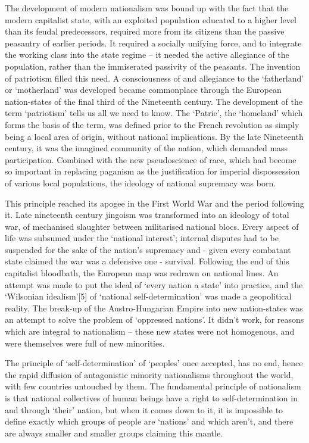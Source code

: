 The development of modern nationalism was bound up with the fact that the modern capitalist state, with an exploited population educated to a higher level than its feudal predecessors, required more from its citizens than the passive peasantry of earlier periods.
It required a socially unifying force, and to integrate the working class into the state regime – it needed the active allegiance of the population, rather than the immiserated passivity of the peasants.
The invention of patriotism filled this need.
A consciousness of and allegiance to the ‘fatherland’ or ‘motherland’ was developed became commonplace through the European nation-states of the final third of the Nineteenth century.
The development of the term ‘patriotism’ tells us all we need to know.
The ‘Patrie’, the ‘homeland’ which forms the basis of the term, was defined prior to the French revolution as simply being a local area of origin, without national implications.
By the late Nineteenth century, it was the imagined community of the nation, which demanded mass participation.
Combined with the new pseudoscience of race, which had become so important in replacing paganism as the justification for imperial dispossession of various local populations, the ideology of national supremacy was born.

This principle reached its apogee in the First World War and the period following it.
Late nineteenth century jingoism was transformed into an ideology of total war, of mechanised slaughter between militarised national blocs.
Every aspect of life was subsumed under the ‘national interest’; internal disputes had to be suspended for the sake of the nation’s supremacy and - given every combatant state claimed the war was a defensive one - survival.
Following the end of this capitalist bloodbath, the European map was redrawn on national lines.
An attempt was made to put the ideal of ‘every nation a state’ into practice, and the ‘Wilsonian idealism’[5] of ‘national self-determination’ was made a geopolitical reality.
The break-up of the Austro-Hungarian Empire into new nation-states was an attempt to solve the problem of ‘oppressed nations’.
It didn’t work, for reasons which are integral to nationalism – these new states were not homogenous, and were themselves were full of new minorities.

The principle of ‘self-determination’ of ‘peoples’ once accepted, has no end, hence the rapid diffusion of antagonistic minority nationalisms throughout the world, with few countries untouched by them.
The fundamental principle of nationalism is that national collectives of human beings have a right to self-determination in and through ‘their’ nation, but when it comes down to it, it is impossible to define exactly which groups of people are ‘nations’ and which aren’t, and there are always smaller and smaller groups claiming this mantle.

